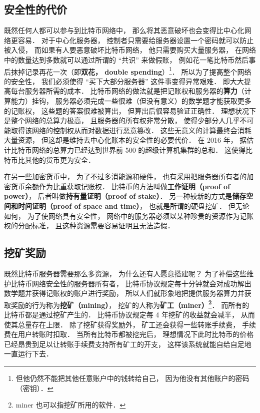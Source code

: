 \subsection{安全性的代价}
既然任何人都可以参与到比特币网络中， 那么将其恶意破坏也会变得比中心化网络更容易． 对于中心化服务器， 控制者只需要给服务器设置一个密码就可以防止被入侵， 而如果有人要恶意破坏比特币网络， 他只需要购买大量服务器， 在网络中的数量达到多数就可以通过所谓的 “共识” 来做假账， 例如花一笔比特币然后事后抹掉记录再花一次（即\textbf{双花， double spending}）\footnote{但他仍然不能把其他任意账户中的钱转给自己， 因为他没有其他账户的密码（密钥）．}． 所以为了提高整个网络的安全性， 我们必须使得 “买下大部分服务器” 这件事变得异常艰难． 即大大提高每台服务器所需的成本． 比特币网络的做法就是把记账权和服务器的\textbf{算力}（计算能力）挂钩， 服务器必须完成一些很难（但没有意义）的数学题才能获取更多的记账权， 这些题的答案很难被算出， 但算出后很容易验证正确性． 理想状况下是整个网络的总算力极高， 且服务器的所有权非常分散， 使得少部分人几乎不可能取得该网络的控制权从而对数据进行恶意篡改． 这些无意义的计算最终会消耗大量资源， 但这却是维持去中心化账本的安全性的必要代价． 在 2016 年， 据估计比特币网络的总算力已经达到世界前 500 的超级计算机集群的总和． 这使得比特币比其他的货币更为安全．

在另一些加密货币中， 为了不过多消能源和硬件， 也有采用把服务器所有者的加密货币余额作为比重获取记账权． 比特币的方法叫做\textbf{工作证明（proof of power）}， 后者叫做\textbf{持有量证明（proof of stake）}． 另一种较新的方式是\textbf{储存空间和时间证明（proof of space and time）}， 也就是所谓的硬盘挖矿． 但无论如何， 为了使网络具有安全性， 网络中的服务器必须以某种珍贵的资源作为记账权的分配标准， 且这种资源需要容易证明且无法造假．

\subsection{挖矿奖励}
既然比特币服务器需要那么多资源， 为什么还有人愿意搭建呢？ 为了补偿这些维护比特币网络安全性的服务器所有者， 比特币协议规定每十分钟就会对成功解出数学题并获得记账权的账户进行奖励， 所以人们就形象地把提供服务器算力并获取奖励的行为称为\textbf{挖矿（mining）}， 挖矿的人称为\textbf{矿工（miner）\footnote{miner 也可以指挖矿所用的软件．}}． 而所有的比特币都是通过挖矿产生的． 比特币协议规定每 4 年挖矿的收益就会减半， 从而使其总量存在上限． 除了挖矿获得奖励外， 矿工还会获得一些转账手续费， 手续费在用户转账时扣取． 当所有比特币都被挖完后， 理想情况下此时比特币的价格已经昂贵到足以让转账手续费支持所有矿工的开支， 这样该系统就能自给自足地一直运行下去．
